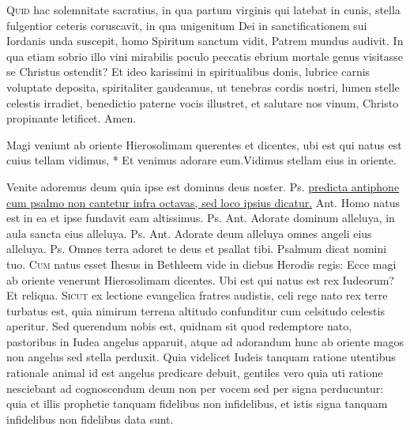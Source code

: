 \begin{multicols*}{2}
\begin{responsory}
\end{responsory}
\lettrine[lines=2]{\zallmancaps \color{Blue} Q}{uid} hac solemnitate sacratius, in qua partum virginis qui latebat in cunis, stella fulgentior ceteris coruscavit, in qua unigenitum Dei in sanctificationem sui Iordanis unda suscepit, homo Spiritum sanctum vidit, Patrem mundus audivit. In qua etiam sobrio illo vini mirabilis poculo peccatis ebrium mortale genus visitasse se Christus ostendit? Et ideo karissimi in spiritualibus donis, lubrice carnis voluptate deposita, spiritaliter gaudeamus, ut tenebras cordis nostri, lumen stelle celestis irradiet, benedictio paterne vocis illustret, et salutare nos vinum, Christo propinante letificet. Amen.
\begin{responsory-doxology}
{Magi veniunt ab oriente Hierosolimam querentes et dicentes, ubi est qui natus est cuius tellam vidimus, * Et venimus adorare eum.}{Vidimus stellam eius in oriente.}
\end{responsory-doxology}
 Venite adoremus deum quia ipse est dominus deus noster. {\color{Red} Ps.}  \ul{predicta antiphone cum psalmo non cantetur infra octavas, sed loco ipsius dicatur.} {\color{Red} Ant.} Homo natus est in ea et ipse fundavit eam altissimus. {\color{Red} Ps.}  {\color{Red} Ant.} Adorate dominum alleluya, in aula sancta eius alleluya. {\color{Red} Ps.}  {\color{Red} Ant.} Adorate deum alleluya omnes angeli eius alleluya. {\color{Red} Ps.}  \V Omnes terra adoret te deus et psallat tibi. \R Psalmum dicat nomini tuo.
\lettrine[lines=2]{\zallmancaps \color{Blue} C}{um} natus esset Ihesus in Bethleem vide in diebus Herodis regis: Ecce magi ab oriente venerunt Hierosolimam dicentes. Ubi est qui natus est rex Iudeorum? Et reliqua.
\lettrine[lines=2]{\zallmancaps \color{Red} S}{icut} ex lectione evangelica fratres audistis, celi rege nato rex terre turbatus est, quia nimirum terrena altitudo confunditur cum celsitudo celestis aperitur. Sed querendum nobis est, quidnam sit quod redemptore nato, pastoribus in Iudea angelus apparuit, atque ad adorandum hunc ab oriente magos non angelus sed stella perduxit. Quia videlicet Iudeis tanquam ratione utentibus rationale animal id est angelus predicare debuit, gentiles vero quia uti ratione nesciebant ad cognoscendum deum non per vocem sed per signa perducuntur: quia et illis prophetie tanquam fidelibus non infidelibus, et istis signa tanquam infidelibus non fidelibus data sunt.

\end{multicols*}

